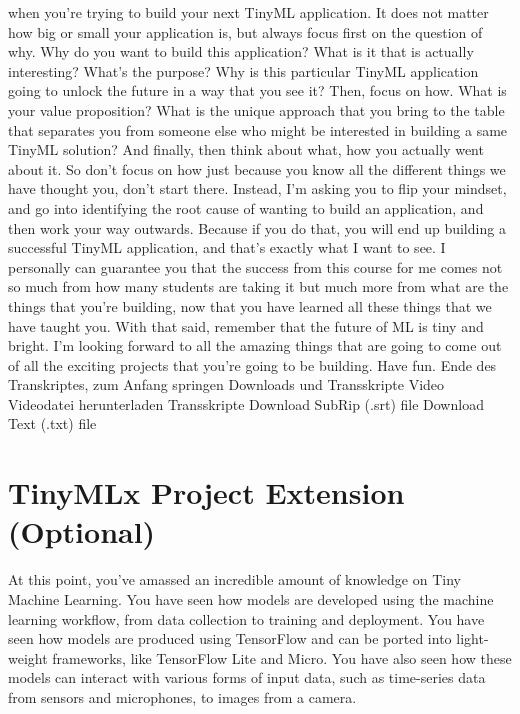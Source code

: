     when you're trying to build your next TinyML application.
    It does not matter how big or small your application is, but always focus first
    on the question of why.
    Why do you want to build this application?
    What is it that is actually interesting?
    What's the purpose?
    Why is this particular TinyML application
    going to unlock the future in a way that you see it?
    Then, focus on how.
    What is your value proposition?
    What is the unique approach that you bring to the table that separates you
    from someone else who might be interested in building a same TinyML
    solution?
    And finally, then think about what, how you actually went about it.
    So don't focus on how just because you know all the different things
    we have thought you, don't start there.
    Instead, I'm asking you to flip your mindset,
    and go into identifying the root cause of wanting to build an application,
    and then work your way outwards.
    Because if you do that, you will end up building a successful TinyML
    application, and that's exactly what I want to see.
    I personally can guarantee you that the success from this course for me
    comes not so much from how many students are taking it but much more
    from what are the things that you're building, now that you have learned all
    these things that we have taught you.
    With that said, remember that the future of ML is tiny and bright.
    I'm looking forward to all the amazing things
    that are going to come out of all the exciting projects
    that you're going to be building.
    Have fun.
    Ende des Transkriptes, zum Anfang springen
    Downloads und Transskripte
    Video
    Videodatei herunterladen
    Transskripte
    Download SubRip (.srt) file
    Download Text (.txt) file    
    
 \section{TinyMLx Project Extension (Optional)}
 
     At this point, you’ve amassed an incredible amount of knowledge on Tiny Machine Learning. You have seen how models are developed using the machine learning workflow, from data collection to training and deployment. You have seen how models are produced using TensorFlow and can be ported into light-weight frameworks, like TensorFlow Lite and Micro. You have also seen how these models can interact with various forms of input data, such as time-series data from sensors and microphones, to images from a camera.
     
